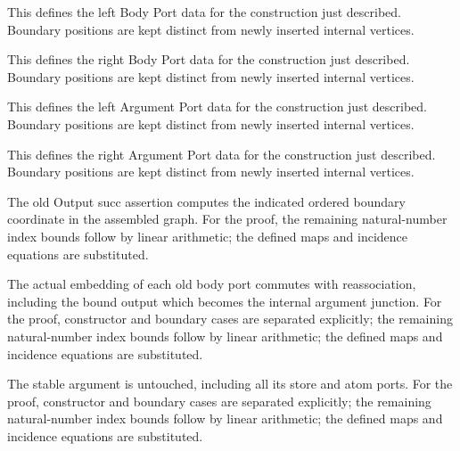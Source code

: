 This defines the left Body Port data for the construction just described. Boundary positions are kept distinct from newly inserted internal vertices.
\par{}

This defines the right Body Port data for the construction just described. Boundary positions are kept distinct from newly inserted internal vertices.
\par{}

This defines the left Argument Port data for the construction just described. Boundary positions are kept distinct from newly inserted internal vertices.
\par{}

This defines the right Argument Port data for the construction just described. Boundary positions are kept distinct from newly inserted internal vertices.
\par{}

The old Output succ assertion computes the indicated ordered boundary coordinate in the assembled graph.
For the proof, the remaining natural-number index bounds follow by linear arithmetic; the defined maps and incidence equations are substituted.
\par{}

The actual embedding of each old body port commutes with reassociation, including the bound output which becomes the internal argument junction.
For the proof, constructor and boundary cases are separated explicitly; the remaining natural-number index bounds follow by linear arithmetic; the defined maps and incidence equations are substituted.
\par{}

The stable argument is untouched, including all its store and atom ports.
For the proof, constructor and boundary cases are separated explicitly; the remaining natural-number index bounds follow by linear arithmetic; the defined maps and incidence equations are substituted.
\par{}

